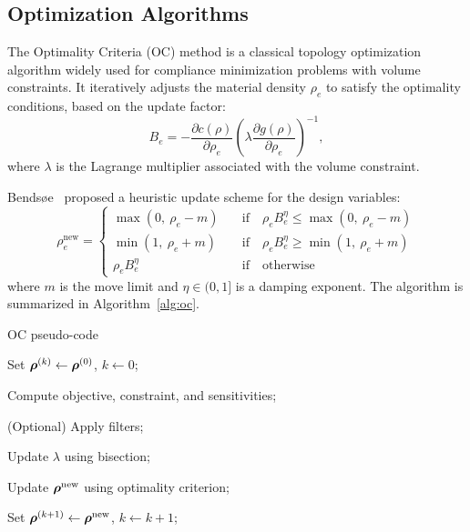 \documentclass[mathpazo]{cicp}
\begin{document}
\subsection{Optimization Algorithms}
The Optimality Criteria (OC) method is a classical topology optimization algorithm widely used for compliance minimization problems with volume constraints. It iteratively adjusts the material density $\rho_e$ to satisfy the optimality conditions, based on the update factor:
\begin{equation*}
	B_e = -\frac{\partial{c}(\rho)}{\partial\rho_e}\left(\lambda\frac{\partial{g}(\rho)}{\partial\rho_e}\right)^{-1},
\end{equation*}
where $\lambda$ is the Lagrange multiplier associated with the volume constraint.
 
Bendsøe~\cite{bendsoe1995optimization} proposed a heuristic update scheme for the design variables:
\begin{equation*}
	\rho_e^{\text{new}}=
	\begin{cases}
		\max(0,~\rho_e-m)\quad&\text{if}\quad \rho_eB_e^\eta\leq\max(0,~\rho_e-m)\\
		\min(1,~\rho_e+m)\quad&\text{if}\quad\rho_eB_e^\eta \geq \min(1,~\rho_e+m)\\
		\rho_eB_e^\eta\quad&\text{if}\quad\text{otherwise}
	\end{cases}
\end{equation*}
where $m$ is the move limit and $\eta\in(0,1]$ is a damping exponent. The algorithm is summarized in Algorithm~\ref{alg:oc}.
\begin{algorithm}[htbp]
	\caption{OC pseudo-code}
	\label{alg:oc}
	\begin{minipage}{\textwidth}
		Set \(\boldsymbol{\rho}^{(k)} \leftarrow \boldsymbol{\rho}^{(0)}\), \(k \leftarrow 0\);
		
		{
			Compute objective, constraint, and sensitivities;
			
			(Optional) Apply filters;
			
			Update \(\lambda\) using bisection;
			
			Update \(\boldsymbol{\rho}^{\text{new}}\) using optimality criterion;
			
			Set \(\boldsymbol{\rho}^{(k+1)} \leftarrow \boldsymbol{\rho}^{\text{new}}\), \(k \leftarrow k + 1\);
		}
	\end{minipage}
\end{algorithm}
\end{document}
